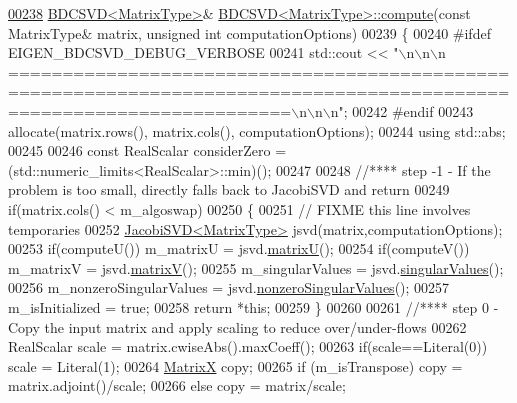\begin{DoxyCode}
\hyperlink{group___s_v_d___module_a52e3c627775010775c64d16a00cdb770}{00238} \hyperlink{group___s_v_d___module_class_eigen_1_1_b_d_c_s_v_d}{BDCSVD<MatrixType>}& \hyperlink{group___s_v_d___module_a52e3c627775010775c64d16a00cdb770}{BDCSVD<MatrixType>::compute}(\textcolor{keyword}{const} 
      MatrixType& matrix, \textcolor{keywordtype}{unsigned} \textcolor{keywordtype}{int} computationOptions) 
00239 \{
00240 \textcolor{preprocessor}{#ifdef EIGEN\_BDCSVD\_DEBUG\_VERBOSE}
00241   std::cout << \textcolor{stringliteral}{"\(\backslash\)n\(\backslash\)n\(\backslash\)n
      ======================================================================================================================\(\backslash\)n\(\backslash\)n\(\backslash\)n"};
00242 \textcolor{preprocessor}{#endif}
00243   allocate(matrix.rows(), matrix.cols(), computationOptions);
00244   \textcolor{keyword}{using} std::abs;
00245 
00246   \textcolor{keyword}{const} RealScalar considerZero = (std::numeric\_limits<RealScalar>::min)();
00247   
00248   \textcolor{comment}{//**** step -1 - If the problem is too small, directly falls back to JacobiSVD and return}
00249   \textcolor{keywordflow}{if}(matrix.cols() < m\_algoswap)
00250   \{
00251     \textcolor{comment}{// FIXME this line involves temporaries}
00252     \hyperlink{group___s_v_d___module_class_eigen_1_1_jacobi_s_v_d}{JacobiSVD<MatrixType>} jsvd(matrix,computationOptions);
00253     \textcolor{keywordflow}{if}(computeU()) m\_matrixU = jsvd.\hyperlink{group___s_v_d___module_afc7fe1546b0f6e1801b86f22f5664cb8}{matrixU}();
00254     \textcolor{keywordflow}{if}(computeV()) m\_matrixV = jsvd.\hyperlink{group___s_v_d___module_a245a453b5e7347f737295c23133238c4}{matrixV}();
00255     m\_singularValues = jsvd.\hyperlink{group___s_v_d___module_a4e7bac123570c348f7ed6be909e1e474}{singularValues}();
00256     m\_nonzeroSingularValues = jsvd.\hyperlink{group___s_v_d___module_afe8a555f38393a319a71ec0f0331c9ef}{nonzeroSingularValues}();
00257     m\_isInitialized = \textcolor{keyword}{true};
00258     \textcolor{keywordflow}{return} *\textcolor{keyword}{this};
00259   \}
00260   
00261   \textcolor{comment}{//**** step 0 - Copy the input matrix and apply scaling to reduce over/under-flows}
00262   RealScalar scale = matrix.cwiseAbs().maxCoeff();
00263   \textcolor{keywordflow}{if}(scale==Literal(0)) scale = Literal(1);
00264   \hyperlink{group___core___module_class_eigen_1_1_matrix}{MatrixX} copy;
00265   \textcolor{keywordflow}{if} (m\_isTranspose) copy = matrix.adjoint()/scale;
00266   \textcolor{keywordflow}{else}               copy = matrix/scale;

\end{DoxyCode}
